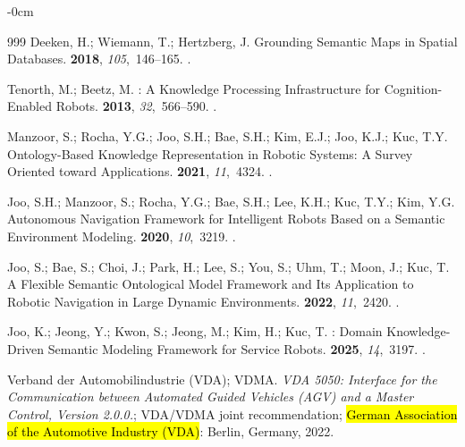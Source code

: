 \documentclass[electronics,article,accept,pdftex,moreauthors]{Definitions/mdpi}
\begin{document}
\begin{adjustwidth}{-\extralength}{0cm}
\begin{thebibliography}{999}
Deeken, H.; Wiemann, T.; Hertzberg, J.
\newblock Grounding Semantic Maps in Spatial Databases.
 {\bf 2018}, {\em
  105},~146--165.
.

Tenorth, M.; Beetz, M.
: A Knowledge Processing Infrastructure for
  Cognition-Enabled Robots.
 {\bf 2013}, {\em
  32},~566--590.
.

Manzoor, S.; Rocha, Y.G.; Joo, S.H.; Bae, S.H.; Kim, E.J.; Joo, K.J.; Kuc, T.Y.
\newblock Ontology-Based Knowledge Representation in Robotic Systems: A Survey
  Oriented toward Applications.
 {\bf 2021}, {\em 11},~4324.
.

Joo, S.H.; Manzoor, S.; Rocha, Y.G.; Bae, S.H.; Lee, K.H.; Kuc, T.Y.; Kim, Y.G.
\newblock Autonomous Navigation Framework for Intelligent Robots Based on a
  Semantic Environment Modeling.
 {\bf 2020}, {\em 10},~3219.
.

Joo, S.; Bae, S.; Choi, J.; Park, H.; Lee, S.; You, S.; Uhm, T.; Moon, J.; Kuc,
  T.
\newblock A Flexible Semantic Ontological Model Framework and Its Application
  to Robotic Navigation in Large Dynamic Environments.
 {\bf 2022}, {\em 11},~2420.
.

Joo, K.; Jeong, Y.; Kwon, S.; Jeong, M.; Kim, H.; Kuc, T.
: Domain Knowledge-Driven Semantic Modeling Framework for
  Service Robots.
 {\bf 2025}, {\em 14},~3197.
.

{Verband der Automobilindustrie (VDA)}; {VDMA}.
\newblock \emph{VDA 5050: Interface for the Communication between Automated Guided Vehicles (AGV) and a Master Control, Version 2.0.0.}; VDA/VDMA joint recommendation;  \hl{German Association of the Automotive Industry (VDA)}: Berlin, Germany,  2022. 



\end{thebibliography}
\end{adjustwidth}
\end{document}
